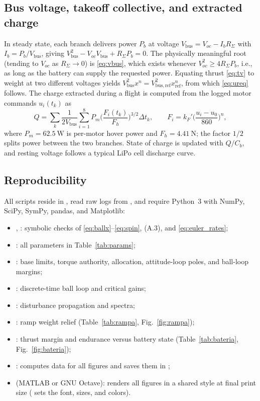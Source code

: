 \subsection{Bus voltage, takeoff collective, and extracted charge}
In steady state, each branch delivers power $P_b$ at voltage $V_{\mathrm{bus}}=V_{oc}-I_bR_\Sigma$ with $I_b=P_b/V_{\mathrm{bus}}$, giving $V_{\mathrm{bus}}^2-V_{oc}V_{\mathrm{bus}}+R_\Sigma P_b=0$. The physically meaningful root (tending to $V_{oc}$ as $R_\Sigma\to0$) is \eqref{eq:vbus}, which exists whenever $V_{oc}^2\ge4R_\Sigma P_b$, i.e., as long as the battery can supply the requested power. Equating thrust \eqref{eq:tv} to weight at two different voltages yields $V_{\mathrm{bus}}^2x^n=V_{\mathrm{bus,ref}}^2x_{\mathrm{ref}}^n$, from which \eqref{eq:ureq} follows. The charge extracted during a flight is computed from the logged motor commands $u_i(t_k)$ as
\begin{equation}
  Q=\sum_k\frac{1}{2V_{\mathrm{bus}}}\sum_{i=1}^{8}P_m\Big(\frac{F_i(t_k)}{F_h}\Big)^{3/2}\Delta t_k,\qquad F_i=k_F'\Big(\frac{u_i-u_0}{860}\Big)^n,
  \tag{A.4}
\end{equation}
where $P_m=\SI{62.5}{\watt}$ is per-motor hover power and $F_h=\SI{4.41}{\newton}$; the factor $1/2$ splits power between the two branches. State of charge is updated with $Q/C_b$, and resting voltage follows a typical LiPo cell discharge curve.

\subsection{Reproducibility}
All scripts reside in , read raw logs from , and require Python~3 with NumPy, SciPy, SymPy, pandas, and Matplotlib:
\begin{itemize}
  \item {}, : symbolic checks of \eqref{eq:ballx}--\eqref{eq:spin}, (A.3), and \eqref{eq:euler_rates};
  \item {}: all parameters in Table~\ref{tab:params};
  \item {}: base limits, torque authority, allocation, attitude-loop poles, and ball-loop margins;
  \item {}: discrete-time ball loop and critical gains;
  \item {}: disturbance propagation and spectra;
  \item {}: ramp weight relief (Table~\ref{tab:rampa}, Fig.~\ref{fig:rampa});
  \item {}: thrust margin and endurance versus battery state (Table~\ref{tab:bateria}, Fig.~\ref{fig:bateria});
  \item {}: computes data for all figures and saves them in ;
  \item {} (MATLAB or GNU Octave): renders all figures in a shared style at final print size ( sets the font, sizes, and colors).
\end{itemize}
